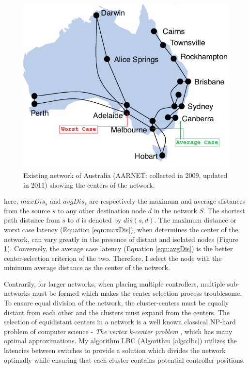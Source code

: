 \documentclass{IEEEtran}
\begin{document}
	\begin{figure}
		\centering
		\includegraphics[width=\linewidth]{Images/aarnet2009cc.png}
		\caption{Existing network of Australia (AARNET: collected in 2009, updated in 2011) showing the centers of the network.}
		\label{fig:aarnetcc}
	\end{figure}

	here, $maxDis_{s}$ and $avgDis_s$ are respectively the maximum and average distances from the source $s$ to any other destination node $d$ in the network $S$. The shortest path distance from $s$ to $d$ is denoted by $dis(s,d)$. The maximum distance or worst case latency (Equation \ref{eqn:maxDis}), when determines the center of the network, can vary greatly in the presence of distant and isolated nodes (Figure \ref{fig:aarnetcc}). Conversely, the average case latency (Equation \ref{eqn:avgDis}) is the better center-selection criterion of the two. Therefore, I select the node with the minimum average distance as the center of the network.
	
	Contrarily, for larger networks, when placing multiple controllers, multiple sub-networks must be formed which makes the center selection process troublesome. To ensure equal division of the network, the cluster-centers must be equally distant from each other and the clusters must expand from the centers. The selection of equidistant centers in a network is a well known classical NP-hard problem of computer science - \textit{The vertex k-center problem} \cite{kariv1979algorithmic}, which has many optimal approximations. My algorithm LBC (Algorithm \ref{algo:lbc}) utilizes the latencies between switches to provide a solution which divides the network optimally while ensuring that each cluster contains potential controller positions.
	
\end{document}
